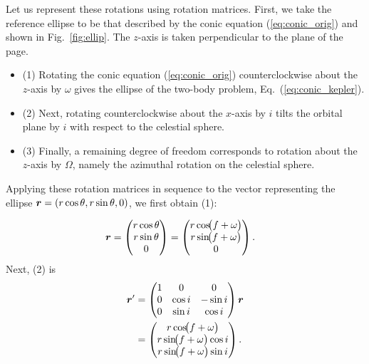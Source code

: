 Let us represent these rotations using rotation matrices. First, we take the reference ellipse to be that described by the conic equation (\ref{eq:conic_orig}) and shown in Fig.~\ref{fig:ellip}. The $z$-axis is taken perpendicular to the plane of the page.
\begin{itemize}
\item (1) Rotating the conic equation (\ref{eq:conic_orig}) counterclockwise about the $z$-axis by $\omega$ gives the ellipse of the two-body problem, Eq.~(\ref{eq:conic_kepler}).
\item (2) Next, rotating counterclockwise about the $x$-axis by $i$ tilts the orbital plane by $i$ with respect to the celestial sphere. 
\item (3) Finally, a remaining degree of freedom corresponds to rotation about the $z$-axis by $\Omega$, namely the azimuthal rotation on the celestial sphere.
\end{itemize}

Applying these rotation matrices in sequence to the vector representing the ellipse $\boldsymbol{r} = (r \cos{\theta}, r \sin{\theta},0)$, we first obtain (1):

\begin{align}
\boldsymbol{r} &=
\begin{pmatrix}
r\cos\theta\\
r\sin\theta\\
0
\end{pmatrix}
=
\begin{pmatrix}
r\cos\!\bigl(f+\omega\bigr)\\
r\sin\!\bigl(f+\omega\bigr)\\
0
\end{pmatrix}
.
\end{align}
Next, (2) is 
\begin{align}
\boldsymbol{r}^\prime &=
\begin{pmatrix}
1 & 0        & 0\\
0 & \cos i   & -\sin i\\
0 & \sin i   &  \cos i
\end{pmatrix}
\boldsymbol{r} \\
&=
\begin{pmatrix}
r\cos\!\bigl(f+\omega\bigr)\\
r\sin\!\bigl(f+\omega\bigr)\cos i\\
r\sin\!\bigl(f+\omega\bigr)\sin i
\end{pmatrix}
.
\end{align}

